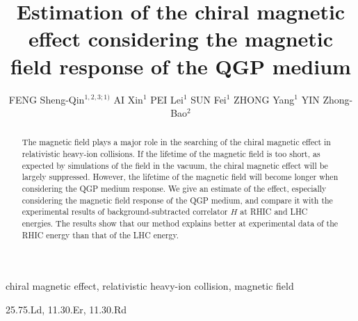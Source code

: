 \documentclass[a4paper,10pt,twoside]{cpc-hepnp}
\begin{document}
\begin{CJK*}{GBK}{song}




\title{Estimation of the chiral magnetic effect considering the magnetic field response of the QGP medium}

\author{%
		FENG Sheng-Qin$^{1,2,3;1)}$%
\quad AI Xin$^{1}$%
\quad PEI Lei$^{1}$%
\quad SUN Fei$^{1}$%
\quad ZHONG Yang$^{1}$%
\quad YIN Zhong-Bao$^{2}$
}
\maketitle

\address{%
$^1$ College of Science, China Three Gorges University, Yichang 443002, China\\
$^2$ Key Laboratory of Quark and Lepton Physics (MOE) and Institute of Particle Physics,\\
Central China Normal University, Wuhan 430079, China\\
$^3$ School of Physics and Technology, Wuhan University, Wuhan 430072, China}



\begin{abstract}
The magnetic field plays a major role in the searching of the chiral magnetic effect in relativistic heavy-ion collisions. If the lifetime of the magnetic field is too short, as expected by simulations of the field in the vacuum, the chiral magnetic effect will be largely suppressed. However, the lifetime of the magnetic field will become longer when considering the QGP medium response. We give an estimate of the effect, especially considering the magnetic field response of the QGP medium, and compare it with the experimental results of background-subtracted correlator $H$ at RHIC and LHC energies. The results show that our method explains better at experimental data of the RHIC energy than that of the LHC energy.
\end{abstract}

\begin{keyword}
chiral magnetic effect, relativistic heavy-ion collision, magnetic field
\end{keyword}

\begin{pacs}
25.75.Ld, 11.30.Er, 11.30.Rd
\end{pacs}



\end{CJK*}
\end{document}
